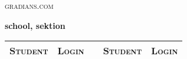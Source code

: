 \documentclass{tufte-handout}
\begin{document}
  \begin{fullwidth}
    \begin{flushleft}
      \huge \textsc{gradians.com}
    \end{flushleft}
    \begin{flushright}
      \LARGE \textbf{school, sektion}
    \end{flushright}

    \begin{table}
      \begin{tabular}{llcll}
        \toprule
          \textsc{Student} & \textsc{Login} & \hspace{2cm} & \textsc{Student} & \textsc{Login} \\
        \midrule
      \end{tabular}
    \end{table}
  \end{fullwidth}
\end{document}
